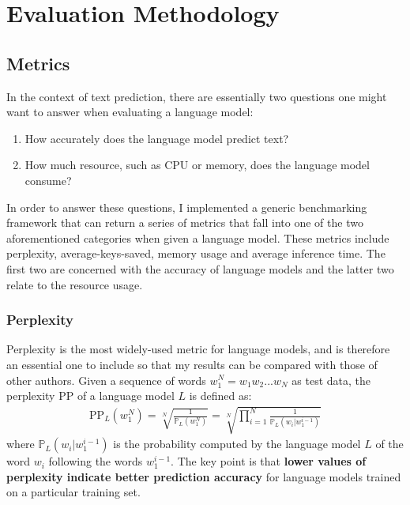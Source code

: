 \documentclass[a4paper, 12pt]{report}
\newcommand{\tbf}[1]{\textbf{#1}}
\begin{document}
\section{Evaluation Methodology}

\subsection{Metrics}

In the context of text prediction, there are essentially two questions one might want to answer when evaluating a language model:
\begin{enumerate}
\item
	How accurately does the language model predict text?
\item
	How much resource, such as CPU or memory, does the language model consume?
\end{enumerate}

In order to answer these questions, I implemented a generic benchmarking framework that can return a series of metrics that fall into one of the two aforementioned categories when given a language model. These metrics include perplexity, average-keys-saved, memory usage and average inference time. The first two are concerned with the accuracy of language models and the latter two relate to the resource usage.

\subsubsection{Perplexity}

Perplexity is the most widely-used metric for language models, and is therefore an essential one to include so that my results can be compared with those of other authors. Given a sequence of words $w_1^{N} = w_1w_2...w_N$ as test data, the perplexity PP of a language model $L$ is defined as:
\begin{gather}
	\text{PP}_L(w_1^N) = \sqrt[N]{\frac{1}{\mathbb{P}_L(w_1^N)}} = \sqrt[N]{\prod_{i=1}^{N}\frac{1}{\mathbb{P}_L(w_i | w_1^{i-1})}}
\end{gather}
where $\mathbb{P}_L(w_i | w_1^{i-1})$ is the probability computed by the language model $L$ of the word $w_i$ following the words $w_1^{i-1}$. The key point is that \tbf{lower values of perplexity indicate better prediction accuracy} for language models trained on a particular training set. \\
\end{document}
